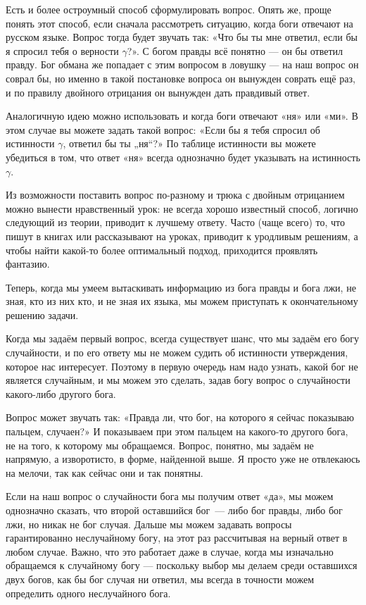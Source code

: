 Есть и более остроумный способ сформулировать вопрос. Опять же, проще понять этот способ, если сначала рассмотреть ситуацию, когда боги отвечают на русском языке. Вопрос тогда будет звучать так: «Что бы ты мне ответил, если бы я спросил тебя о верности $\gamma$?». С богом правды всё понятно — он бы ответил правду. Бог обмана же попадает с этим вопросом в ловушку — на наш вопрос он соврал бы, но именно в такой постановке вопроса он вынужден соврать ещё раз, и по правилу двойного отрицания он вынужден дать правдивый ответ.

Аналогичную идею можно использовать и когда боги отвечают «ня» или «ми». В этом случае вы можете задать такой вопрос: «Если бы я тебя спросил об истинности $\gamma$, ответил бы ты „ня“?» По таблице истинности вы можете убедиться в том, что ответ «ня» всегда однозначно будет указывать на истинность $\gamma$.

Из возможности поставить вопрос по-разному и трюка с двойным отрицанием можно вынести нравственный урок: не всегда хорошо известный способ, логично следующий из теории, приводит к лучшему ответу. Часто (чаще всего) то, что пишут в книгах или рассказывают на уроках, приводит к уродливым решениям, а чтобы найти какой-то более оптимальный подход, приходится проявлять фантазию.

Теперь, когда мы умеем вытаскивать информацию из бога правды и бога лжи, не зная, кто из них кто, и не зная их языка, мы можем приступать к окончательному решению задачи.

Когда мы задаём первый вопрос, всегда существует шанс, что мы задаём его богу случайности, и по его ответу мы не можем судить об истинности утверждения, которое нас интересует. Поэ\-то\-му в первую очередь нам надо узнать, какой бог не является случайным, и мы можем это сделать, задав богу вопрос о случайности какого-либо другого бога.

Вопрос может звучать так: «Правда ли, что бог, на которого я сейчас показываю пальцем, случаен?» И показываем при этом пальцем на какого-то другого бога, не на того, к которому мы обращаемся. Вопрос, понятно, мы задаём не напрямую, а изворотисто, в форме, найденной выше. Я просто уже не отвлекаюсь на мелочи, так как сейчас они и так понятны.

Если на наш вопрос о случайности бога мы получим ответ «да», мы можем однозначно сказать, что второй оставшийся бог~--- либо бог правды, либо бог лжи, но никак не бог случая. Дальше мы можем задавать вопросы гарантированно неслучайному богу, на этот раз рассчитывая на верный ответ в любом случае. Важно, что это работает даже в случае, когда мы изначально обращаемся к случайному богу — поскольку выбор мы делаем среди оставшихся двух богов, как бы бог случая ни ответил, мы всегда в точности можем определить одного неслучайного бога.

